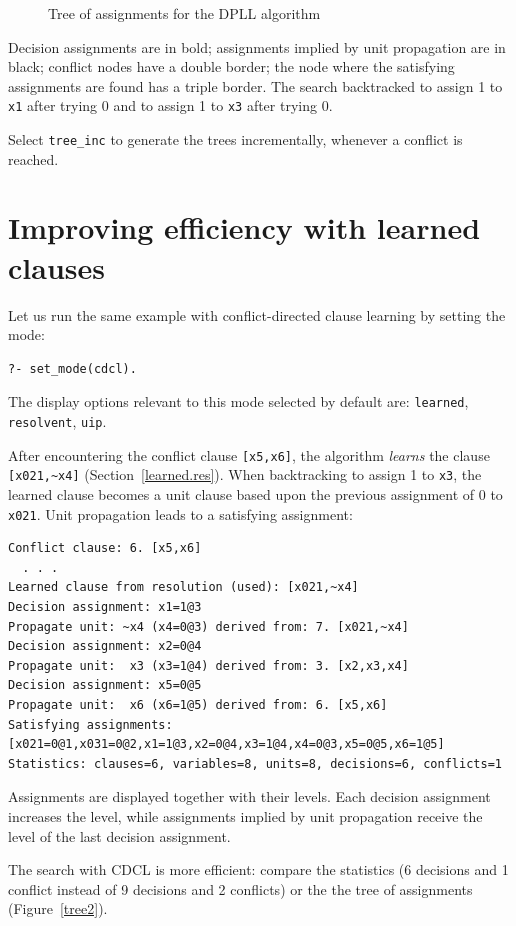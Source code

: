 \documentclass[11pt]{report}
\newcommand*{\p}[1]{\textup{\texttt{#1}}}
\begin{document}
\begin{figure}
\begin{center}
\end{center}
\caption{Tree of assignments for the DPLL algorithm}\label{tree1}
\end{figure}

Decision assignments are in bold; assignments implied by unit
propagation are in black; conflict nodes have a double border; the node
where the satisfying assignments are found has a triple border. The
search backtracked to assign 1 to \p{x1} after trying 0 and to assign 1
to \p{x3} after trying 0.

Select \p{tree\_inc} to generate the trees incrementally, whenever a
conflict is reached.

\section{Improving efficiency with learned clauses}

Let us run the same example with conflict-directed clause learning by
setting the mode:

\begin{verbatim}
?- set_mode(cdcl).
\end{verbatim}

The display options relevant to this mode selected by default are:
\p{learned}, \p{resolvent}, \p{uip}.

After encountering the conflict clause \verb+[x5,x6]+, the algorithm
\emph{learns} the clause \verb+[x021,~x4]+ (Section~\ref{learned.res}).
When backtracking to assign 1 to \p{x3}, the learned clause becomes a
unit clause based upon the previous assignment of 0 to \p{x021}. Unit
propagation leads to a satisfying assignment:

\begin{verbatim}
Conflict clause: 6. [x5,x6]
  . . .
Learned clause from resolution (used): [x021,~x4]
Decision assignment: x1=1@3
Propagate unit: ~x4 (x4=0@3) derived from: 7. [x021,~x4]
Decision assignment: x2=0@4
Propagate unit:  x3 (x3=1@4) derived from: 3. [x2,x3,x4]
Decision assignment: x5=0@5
Propagate unit:  x6 (x6=1@5) derived from: 6. [x5,x6]
Satisfying assignments:
[x021=0@1,x031=0@2,x1=1@3,x2=0@4,x3=1@4,x4=0@3,x5=0@5,x6=1@5]
Statistics: clauses=6, variables=8, units=8, decisions=6, conflicts=1
\end{verbatim}
Assignments are displayed together with their levels. Each decision
assignment increases the level, while assignments implied by unit
propagation receive the level of the last decision assignment. 

The search with CDCL is more efficient: compare the statistics (6
decisions and 1 conflict instead of 9 decisions and 2 conflicts) or the
the tree of assignments (Figure~\ref{tree2}).
\end{document}
